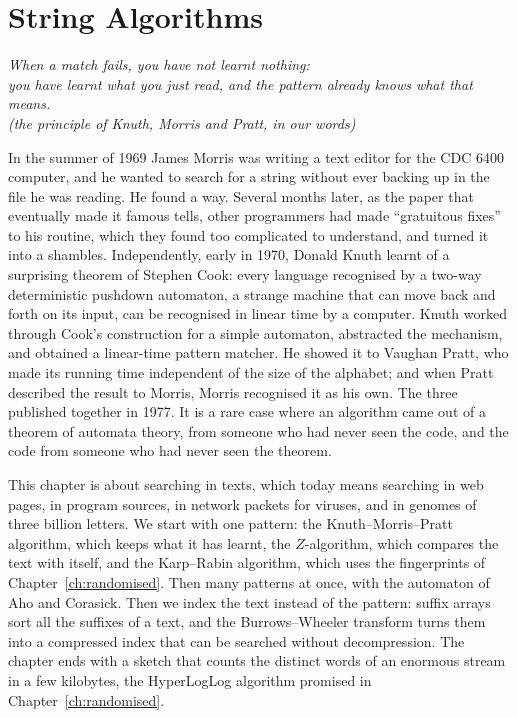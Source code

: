 \chapter{String Algorithms}\label{ch:strings}

\begin{center}\itshape
When a match fails, you have not learnt nothing:\\
you have learnt what you just read, and the pattern already knows what that means.\\
\upshape(the principle of Knuth, Morris and Pratt, in our words)
\end{center}

In the summer of 1969 James Morris was writing a text editor for the CDC 6400 computer, and he wanted to search for a string without ever backing up in the file he was reading. He found a way. Several months later, as the paper that eventually made it famous tells, other programmers had made ``gratuitous fixes'' to his routine, which they found too complicated to understand,
and turned it into a shambles. Independently, early in 1970, Donald Knuth learnt of a surprising theorem of Stephen Cook: every language recognised by a two-way deterministic pushdown automaton, a strange machine that can move back and forth on its input, can be recognised in linear time by a computer. Knuth worked through Cook's construction for a simple automaton, abstracted the mechanism, and obtained a linear-time pattern matcher. He showed it to Vaughan Pratt, who
made its running time independent of the size of the alphabet; and when Pratt described the result to Morris, Morris recognised it as his own. The three published together in 1977. It is a rare case where an algorithm came out of a theorem of automata theory, from someone who had never seen the code, and the code from someone who had never seen the theorem.

This chapter is about searching in texts, which today means searching in web pages, in program sources, in network packets for viruses, and in genomes of three billion letters. We start with one pattern: the Knuth--Morris--Pratt algorithm, which keeps what it has learnt, the $Z$-algorithm, which compares the text with itself, and the Karp--Rabin algorithm, which uses the fingerprints of Chapter~\ref{ch:randomised}. Then many patterns at once, with the automaton of Aho and Corasick.
Then we index the text instead of the pattern: suffix arrays sort all the suffixes of a text, and the Burrows--Wheeler transform turns them into a compressed index that can be searched without decompression. The chapter ends with a sketch that counts the distinct words of an enormous stream in a few kilobytes, the HyperLogLog algorithm promised in Chapter~\ref{ch:randomised}.

